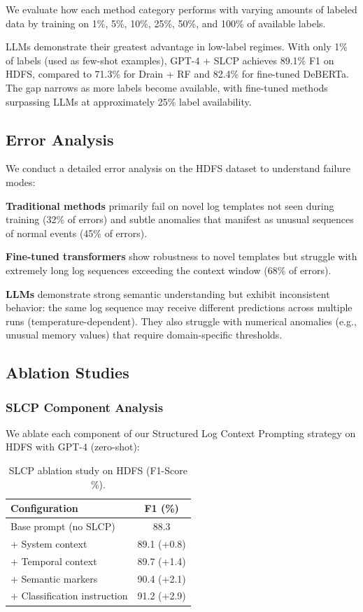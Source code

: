 \documentclass[conference]{IEEEtran}
\begin{document}
We evaluate how each method category performs with varying amounts of labeled data by training on 1\%, 5\%, 10\%, 25\%, 50\%, and 100\% of available labels.

LLMs demonstrate their greatest advantage in low-label regimes. With only 1\% of labels (used as few-shot examples), GPT-4 + SLCP achieves 89.1\% F1 on HDFS, compared to 71.3\% for Drain + RF and 82.4\% for fine-tuned DeBERTa. The gap narrows as more labels become available, with fine-tuned methods surpassing LLMs at approximately 25\% label availability.

\subsection{Error Analysis}

We conduct a detailed error analysis on the HDFS dataset to understand failure modes:

\textbf{Traditional methods} primarily fail on novel log templates not seen during training (32\% of errors) and subtle anomalies that manifest as unusual sequences of normal events (45\% of errors).

\textbf{Fine-tuned transformers} show robustness to novel templates but struggle with extremely long log sequences exceeding the context window (68\% of errors).

\textbf{LLMs} demonstrate strong semantic understanding but exhibit inconsistent behavior: the same log sequence may receive different predictions across multiple runs (temperature-dependent). They also struggle with numerical anomalies (e.g., unusual memory values) that require domain-specific thresholds.

\subsection{Ablation Studies}

\subsubsection{SLCP Component Analysis}

We ablate each component of our Structured Log Context Prompting strategy on HDFS with GPT-4 (zero-shot):

\begin{table}[h]
\centering
\caption{SLCP ablation study on HDFS (F1-Score \%).}
\label{tab:ablation}
\begin{tabular}{lc}
\toprule
\textbf{Configuration} & \textbf{F1 (\%)} \\
\midrule
Base prompt (no SLCP) & 88.3 \\
+ System context & 89.1 (+0.8) \\
+ Temporal context & 89.7 (+1.4) \\
+ Semantic markers & 90.4 (+2.1) \\
+ Classification instruction & 91.2 (+2.9) \\
\bottomrule
\end{tabular}
\end{table}
\end{document}
